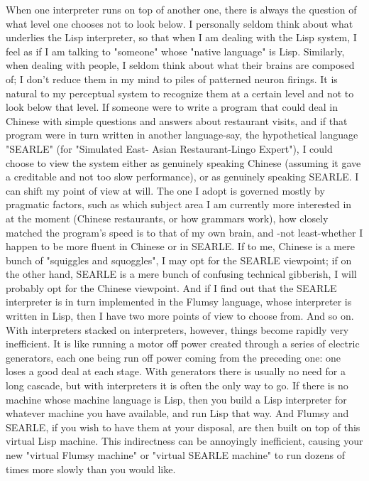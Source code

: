         When one interpreter runs on top of another one, there is always the question
of what level one chooses not to look below. I personally seldom think about what
underlies the Lisp interpreter, so that when I am dealing with the Lisp system, I feel as
if I am talking to "someone" whose "native language" is Lisp. Similarly, when dealing
with people, I seldom think about what their brains are composed of; I don't reduce
them in my mind to piles of patterned neuron firings. It is natural to my perceptual
system to recognize them at a certain level and not to look below that level.
        If someone were to write a program that could deal in Chinese with simple
questions and answers about restaurant visits, and if that program were in turn written
in another language-say, the hypothetical language "SEARLE" (for "Simulated East-
Asian Restaurant-Lingo Expert"), I could choose to view the system either as
genuinely speaking Chinese (assuming it gave a creditable and not too slow
performance), or as genuinely speaking SEARLE. I can shift my point of view at will.
The one I adopt is governed mostly by pragmatic factors, such as which subject area I
am currently more interested in at the moment (Chinese restaurants, or how grammars
work), how closely matched the program's speed is to that of my own brain, and -not
least-whether I happen to be more fluent in Chinese or in SEARLE. If to me, Chinese
is a mere bunch of "squiggles and squoggles", I may opt for the SEARLE viewpoint;
if on the other hand, SEARLE is a mere bunch of confusing technical gibberish, I will
probably opt for the Chinese viewpoint. And if I find out that the SEARLE interpreter
is in turn implemented in the Flumsy language, whose interpreter is written in Lisp,
then I have two more points of view to choose from. And so on.
        With interpreters stacked on interpreters, however, things become rapidly very
inefficient. It is like running a motor off power created through a series of electric
generators, each one being run off power coming from the preceding one: one loses a
good deal at each stage. With generators there is usually no need for a long cascade,
but with interpreters it is often the only way to go. If there is no machine whose
machine language is Lisp, then you build a Lisp interpreter for whatever machine you
have available, and run Lisp that way. And Flumsy and SEARLE, if you wish to have
them at your disposal, are then built on top of this virtual Lisp machine. This
indirectness can be annoyingly inefficient, causing your new "virtual Flumsy
machine" or "virtual SEARLE machine" to run dozens of times more slowly than you
would like.




